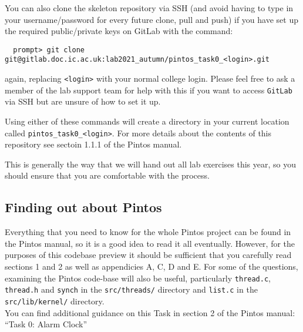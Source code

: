 \documentclass[a4paper,12pt]{article}
\newcommand{\shell}[1]{\lstinline!#1!}
\begin{document}
You can also clone the skeleton repository via SSH (and avoid having to type in your username/password for every future clone, pull and push) if you have set up the required public/private keys on GitLab with the command:
%
\begin{lstlisting}
  prompt> git clone git@gitlab.doc.ic.ac.uk:lab2021_autumn/pintos_task0_<login>.git
\end{lstlisting}
%
again, replacing \shell{<login>} with your normal college login.
Please feel free to ask a member of the lab support team for help with this if you want to access \shell{GitLab} via SSH but are unsure of how to set it up.

Using either of these commands will create a directory in your current location called \shell{pintos_task0_<login>}.
For more details about the contents of this repository see sectoin 1.1.1 of the Pintos manual.

This is generally the way that we will hand out all lab exercises this year, so you should ensure that you are comfortable with the process.


\subsection*{Finding out about Pintos}
Everything that you need to know for the whole Pintos project can be found in the Pintos manual, 
so it is a good idea to read it all eventually.
However, for the purposes of this codebase preview it should be sufficient that you carefully read sections 1 and 2 
as well as appendicies A, C, D and E. 
For some of the questions, examining the Pintos code-base will also be useful, 
particularly \shell{thread.c}, \shell{thread.h} and \shell{synch} in the \shell{src/threads/} directory
and \shell{list.c} in the \shell{src/lib/kernel/} directory.\\

\noindent You can find additional guidance on this Task in section 2 of the Pintos manual: ``Task 0: Alarm Clock''
\end{document}
